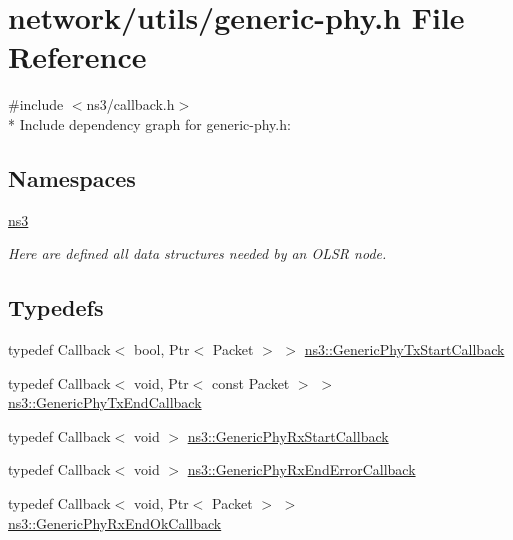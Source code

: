 \hypertarget{generic-phy_8h}{}\section{network/utils/generic-\/phy.h File Reference}
\label{generic-phy_8h}
{\ttfamily \#include $<$ns3/callback.\+h$>$}\\*
Include dependency graph for generic-\/phy.h\+:
\subsection*{Namespaces}
\begin{DoxyCompactItemize}
\item 
 \hyperlink{namespacens3}{ns3}
\begin{DoxyCompactList}\small\item\em Here are defined all data structures needed by an O\+L\+SR node. \end{DoxyCompactList}\end{DoxyCompactItemize}
\subsection*{Typedefs}
\begin{DoxyCompactItemize}
\item 
typedef Callback$<$ bool, Ptr$<$ Packet $>$ $>$ \hyperlink{namespacens3_ae7520442eb033588646b0ba04c79bdd8}{ns3\+::\+Generic\+Phy\+Tx\+Start\+Callback}
\item 
typedef Callback$<$ void, Ptr$<$ const Packet $>$ $>$ \hyperlink{namespacens3_abe7bae5316e52e374e3cdcdaffe585fa}{ns3\+::\+Generic\+Phy\+Tx\+End\+Callback}
\item 
typedef Callback$<$ void $>$ \hyperlink{namespacens3_a1c385b3f90e0583c1debfc4a2721cdcf}{ns3\+::\+Generic\+Phy\+Rx\+Start\+Callback}
\item 
typedef Callback$<$ void $>$ \hyperlink{namespacens3_a726dc36898b6cda5b4855ee1671f51da}{ns3\+::\+Generic\+Phy\+Rx\+End\+Error\+Callback}
\item 
typedef Callback$<$ void, Ptr$<$ Packet $>$ $>$ \hyperlink{namespacens3_a46c93af76ee9401eef0753645edc589d}{ns3\+::\+Generic\+Phy\+Rx\+End\+Ok\+Callback}
\end{DoxyCompactItemize}
